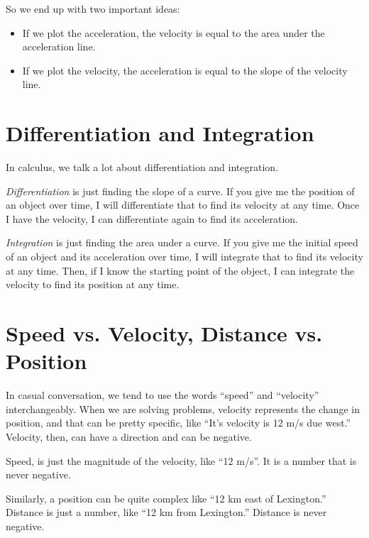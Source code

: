 So we end up with two important ideas:
\begin{itemize}
\item If we plot the acceleration, the velocity is equal to the area under the acceleration line.
\item If we plot the velocity, the acceleration is equal to the slope of the velocity line.
\end{itemize}

\section{Differentiation and Integration}

In calculus, we talk a lot about differentiation and integration.

\textit{Differentiation} is just finding the slope of a curve. If you give me
the position of an object over time, I will differentiate that to find
its velocity at any time. Once I have the velocity, I can differentiate
again to find its acceleration.

\textit{Integration} is just finding the area under a curve. If you give me
the initial speed of an object and its acceleration over time, I will
integrate that to find its velocity at any time. Then, if I know the
starting point of the object, I can integrate the velocity to find its
position at any time.

\section{Speed vs. Velocity, Distance vs. Position}

In casual conversation, we tend to use the words ``speed'' and
``velocity'' interchangeably. When we are solving problems, velocity
represents the change in position, and that can be pretty specific,
like ``It's velocity is 12 m/s due west.'' Velocity, then, can
have a direction and can be negative.

Speed, is just the magnitude of the velocity, like ``12 m/s''.  It is
a number that is never negative.

Similarly, a position can be quite complex like ``12 km east of
Lexington.'' Distance is just a number, like ``12 km from Lexington.''
Distance is never negative.


